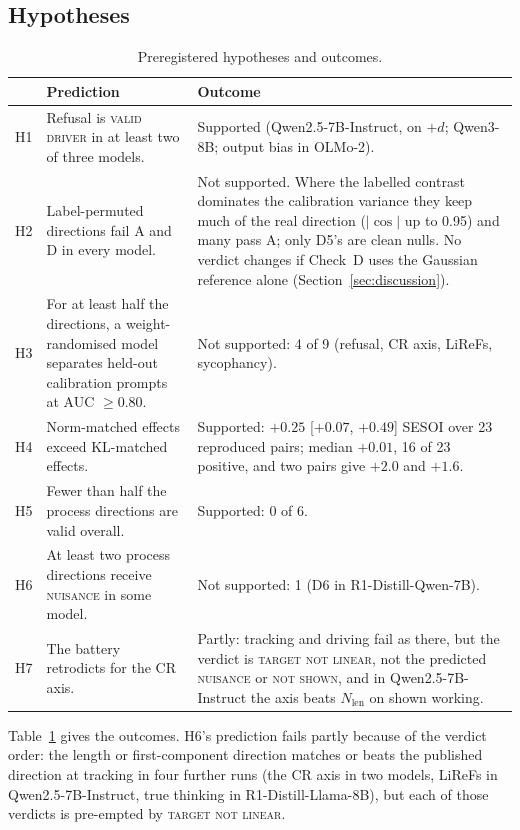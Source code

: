 \documentclass[11pt]{article}
\newcommand{\verdict}[1]{\textsc{\MakeLowercase{#1}}}
\begin{document}
\subsection{Hypotheses}
\begin{table}[t]
\centering\small
\caption{Preregistered hypotheses and outcomes.}
\label{tab:hyp}
\begin{tabularx}{\linewidth}{@{}l X X@{}}
\toprule
 & Prediction & Outcome \\
\midrule
H1 & Refusal is \verdict{VALID DRIVER} in at least two of three models. & Supported (Qwen2.5-7B-Instruct, on $+d$; Qwen3-8B; output bias in OLMo-2). \\
H2 & Label-permuted directions fail A and D in every model. & Not supported. Where the labelled contrast dominates the calibration variance they keep much of the real direction ($|\cos|$ up to 0.95) and many pass A; only D5's are clean nulls. No verdict changes if Check~D uses the Gaussian reference alone (Section~\ref{sec:discussion}). \\
H3 & For at least half the directions, a weight-randomised model separates held-out calibration prompts at AUC $\ge 0.80$. & Not supported: 4 of 9 (refusal, CR axis, LiReFs, sycophancy). \\
H4 & Norm-matched effects exceed KL-matched effects. & Supported: $+0.25$ [$+0.07$, $+0.49$] SESOI over 23 reproduced pairs; median $+0.01$, 16 of 23 positive, and two pairs give $+2.0$ and $+1.6$. \\
H5 & Fewer than half the process directions are valid overall. & Supported: 0 of 6. \\
H6 & At least two process directions receive \verdict{NUISANCE} in some model. & Not supported: 1 (D6 in R1-Distill-Qwen-7B). \\
H7 & The battery retrodicts \citet{ramdan2026crv2} for the CR axis. & Partly: tracking and driving fail as there, but the verdict is \verdict{TARGET NOT LINEAR}, not the predicted \verdict{NUISANCE} or \verdict{NOT SHOWN}, and in Qwen2.5-7B-Instruct the axis beats $N_\text{len}$ on shown working. \\
\bottomrule
\end{tabularx}
\end{table}

Table~\ref{tab:hyp} gives the outcomes. H6's prediction fails partly because of the verdict order: the length or first-component direction matches or beats the published direction at tracking in four further runs (the CR axis in two models, LiReFs in Qwen2.5-7B-Instruct, true thinking in R1-Distill-Llama-8B), but each of those verdicts is pre-empted by \verdict{TARGET NOT LINEAR}.
\end{document}
